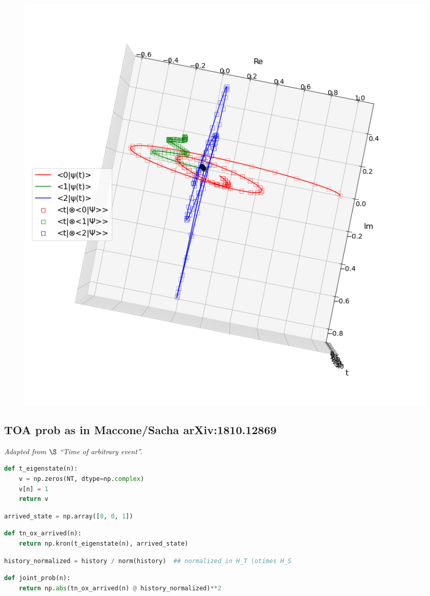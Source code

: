 \begin{figure}[h!]
\centering
\includegraphics[width=0.66\linewidth]{tex/appendix/nb/jupyter/3lev/output_68_1.png}

\end{figure}

\hypertarget{toa-prob-as-in-macconesacha-arxiv1810.12869}{%
\subsection{TOA prob as in Maccone/Sacha
arXiv:1810.12869}\label{toa-prob-as-in-macconesacha-arxiv1810.12869}}

\emph{Adapted from \(\S\) ``Time of arbitrary event''.}


\begin{lstlisting}[language=Python]
def t_eigenstate(n):
    v = np.zeros(NT, dtype=np.complex)
    v[n] = 1
    return v
\end{lstlisting}

\begin{lstlisting}[language=Python]
arrived_state = np.array([0, 0, 1])
\end{lstlisting}

\begin{lstlisting}[language=Python]
def tn_ox_arrived(n):
    return np.kron(t_eigenstate(n), arrived_state)
\end{lstlisting}

\begin{lstlisting}[language=Python]
history_normalized = history / norm(history)  ## normalized in H_T \otimes H_S
\end{lstlisting}

\begin{lstlisting}[language=Python]
def joint_prob(n):
    return np.abs(tn_ox_arrived(n) @ history_normalized)**2
\end{lstlisting}

